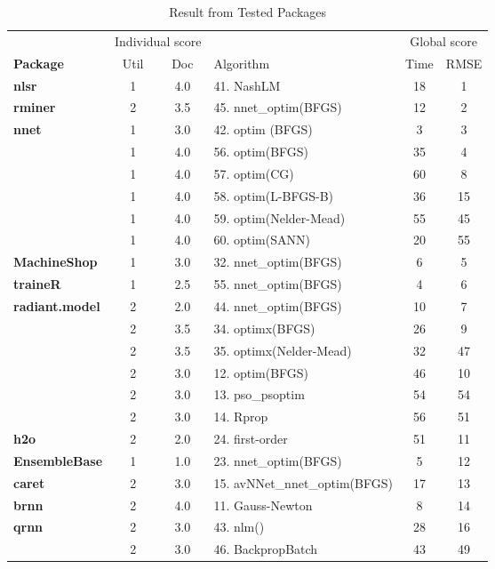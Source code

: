 \begin{Schunk}
\begin{table}

\caption{\label{tab:unnamed-chunk-2}Result from Tested Packages}
\centering
\fontsize{7}{9}\selectfont
\begin{tabular}[t]{>{\bfseries}lcclcc}
\toprule
\multicolumn{1}{c}{ } & \multicolumn{2}{c}{Individual score} & \multicolumn{1}{c}{ } & \multicolumn{2}{c}{Global score} \\
\cmidrule(l{3pt}r{3pt}){2-3} \cmidrule(l{3pt}r{3pt}){5-6}
Package & Util & Doc & Algorithm & Time & RMSE\\
\midrule
nlsr & 1 & 4.0 & 41. NashLM & 18 & 1\\
\cmidrule{1-6}
rminer & 2 & 3.5 & 45. nnet\_optim(BFGS) & 12 & 2\\
\cmidrule{1-6}
nnet & 1 & 3.0 & 42. optim (BFGS) & 3 & 3\\
\cmidrule{1-6}
 & 1 & 4.0 & 56. optim(BFGS) & 35 & 4\\

 & 1 & 4.0 & 57. optim(CG) & 60 & 8\\

 & 1 & 4.0 & 58. optim(L-BFGS-B) & 36 & 15\\

 & 1 & 4.0 & 59. optim(Nelder-Mead) & 55 & 45\\

\multirow{-5}{*}{\raggedright\arraybackslash validann} & 1 & 4.0 & 60. optim(SANN) & 20 & 55\\
\cmidrule{1-6}
MachineShop & 1 & 3.0 & 32. nnet\_optim(BFGS) & 6 & 5\\
\cmidrule{1-6}
traineR & 1 & 2.5 & 55. nnet\_optim(BFGS) & 4 & 6\\
\cmidrule{1-6}
radiant.model & 2 & 2.0 & 44. nnet\_optim(BFGS) & 10 & 7\\
\cmidrule{1-6}
 & 2 & 3.5 & 34. optimx(BFGS) & 26 & 9\\

\multirow{-2}{*}{\raggedright\arraybackslash monmlp} & 2 & 3.5 & 35. optimx(Nelder-Mead) & 32 & 47\\
\cmidrule{1-6}
 & 2 & 3.0 & 12. optim(BFGS) & 46 & 10\\

 & 2 & 3.0 & 13. pso\_psoptim & 54 & 54\\

\multirow{-3}{*}{\raggedright\arraybackslash CaDENCE} & 2 & 3.0 & 14. Rprop & 56 & 51\\
\cmidrule{1-6}
h2o & 2 & 2.0 & 24. first-order & 51 & 11\\
\cmidrule{1-6}
EnsembleBase & 1 & 1.0 & 23. nnet\_optim(BFGS) & 5 & 12\\
\cmidrule{1-6}
caret & 2 & 3.0 & 15. avNNet\_nnet\_optim(BFGS) & 17 & 13\\
\cmidrule{1-6}
brnn & 2 & 4.0 & 11. Gauss-Newton & 8 & 14\\
\cmidrule{1-6}
qrnn & 2 & 3.0 & 43. nlm() & 28 & 16\\
\cmidrule{1-6}
 & 2 & 3.0 & 46. BackpropBatch & 43 & 49\\


\end{tabular}
\end{table}
\end{Schunk}
